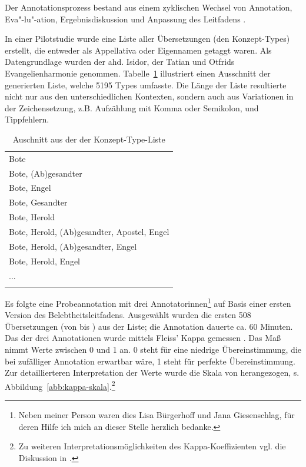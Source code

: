 Der Annotationsprozess bestand aus einem zyklischen Wechsel von Annotation, Eva"-lu"-ation, Ergebnisdiskussion und Anpassung des Leitfadens \parencite[entsprechend dem aus der Computerlinguistik bekannten  (=\,), beschrieben u.a. in][109]{Pustejovsky2012}.

In einer Pilotstudie wurde eine Liste aller Übersetzungen (den Konzept-Types) erstellt, die entweder als Appellativa oder Eigennamen getaggt waren. Als Datengrundlage wurden der ahd. Isidor, der Tatian und Otfrids Evangelienharmonie genommen.  
Tabelle~\ref{tab:konzept-types} illustriert einen Ausschnitt der generierten Liste, welche 5195 Types umfasste. Die Länge der Liste resultierte nicht nur aus den unterschiedlichen Kontexten, sondern auch aus Variationen in der Zeichensetzung, z.B. Aufzählung mit Komma oder Semikolon, und Tippfehlern.  

\begin{table}
\centering
\begin{tabular}{l}
\lsptoprule
\multicolumn{1}{c}{Übersetzung (Konzept-Type)}    \\ \midrule
Bote                                        \\
Bote, (Ab)gesandter                         \\
Bote, Engel                                 \\
Bote, Gesandter                             \\
Bote, Herold                                \\
Bote, Herold, (Ab)gesandter, Apostel, Engel \\
Bote, Herold, (Ab)gesandter, Engel          \\
Bote, Herold, Engel                         \\
...                                         \\ \lspbottomrule
\end{tabular}
\caption{Auschnitt aus der der Konzept-Type-Liste\label{tab:konzept-types}}
\end{table}

Es folgte eine Probeannotation mit drei Annotatorinnen\footnote{Neben meiner Person waren dies Lisa Bürgerhoff und Jana Giesenschlag, für deren Hilfe ich mich an dieser Stelle herzlich bedanke.} auf Basis einer ersten Version des Belebtheitsleitfadens. Ausgewählt wurden die ersten 508 Übersetzungen (von  bis ) aus der Liste; die Annotation dauerte ca. 60 Minuten. Das  der drei Annotationen wurde mittels Fleiss' Kappa gemessen \parencite{Fleiss1971}. Das Maß nimmt Werte zwischen 0 und 1 an. 
0 steht für eine niedrige Übereinstimmung, die bei zufälliger Annotation erwartbar wäre, 1 steht für perfekte Übereinstimmung. Zur detaillierteren Interpretation der Werte wurde die Skala von \textcite{Landis1977} herangezogen, s. Abbildung~\ref{abb:kappa-skala}.\footnote{Zu weiteren Interpretationsmöglichkeiten des Kappa-Koeffizienten vgl. die Diskussion in \textcite[576-577]{Artstein2008}.}

